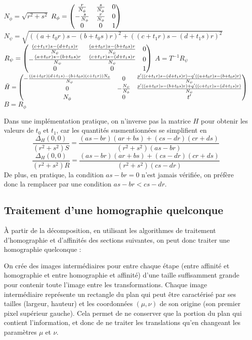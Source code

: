    \begin{algorithme}
     \label{pseudoCodeDecompo}
     \caption{$decomposition(H)$}
     $N_\phi = \sqrt{r^2+s^2}$\;
     $R_\phi = \begin{pmatrix} 
      \frac{r}{N_\phi} & \frac{s}{N_\phi} & 0\\
      -\frac{s}{N_\phi} & \frac{r}{N_\phi} & 0\\
      0 & 0 & 1 \end{pmatrix}$\;
     $N_\psi = \sqrt{((a+t_0r)s-(b+t_0s)r)^2+((c+t_1r)s-(d+t_1s)r)^2}$\;
     $R_\psi = \begin{pmatrix} 
      \frac{(c+t_1r)s-(d+t_1s)r}{N_\psi} & \frac{(a+t_0r)s-(b+t_0s)r}{N_\psi} & 0\\
      -\frac{(a+t_0r)s-(b+t_0s)r}{N_\psi} & \frac{(c+t_1r)s-(d+t_1s)r}{N_\psi} & 0\\
      0 & 0 & 1 \end{pmatrix}$\;
     $A = T^{-1}R_\psi$\;
     $\tilde H = \begin{pmatrix} 
      -\frac{((a+t_0r)(d+t_1s)-(b+t_0s)(c+t_1r))N_\phi}{N_\psi} & 0 & \frac{p'((c+t_1r)s-(d+t_1s)r)-q'((a+t_0r)s-(b+t_0s)r)}{N_\psi}\\
      0 & -\frac{N_\psi}{N_\phi} & \frac{p'((a+t_0r)s-(b+t_0s)r)+q'((c+t_1r)s-(d+t_1s)r)}{N_\psi}\\
      N_\phi & 0 & t' \end{pmatrix}$\;
     $B = R_\phi$\;
   \end{algorithme}
   Dans une implémentation pratique, on n'inverse pas la matrice $H$ pour obtenir les valeurs de $t_0$ et $t_1$, car les quantités susmentionnées se simplifient en
 \[\frac{\Delta_H(0,0)}{(r^2+s^2)S} = \frac{(as-br)(ar+bs)+(cs-dr)(cr+ds)}{(r^2+s^2)(as-br)}\]
 \[\frac{\Delta_H(0,0)}{(r^2+s^2)R} = \frac{(as-br)(ar+bs)+(cs-dr)(cr+ds)}{(r^2+s^2)(cs-dr)}\]
 De plus, en pratique, la condition $as-br=0$ n'est jamais vérifiée, on préfère donc la remplacer par une condition $as-br<cs-dr$.

\subsection{Traitement d'une homographie quelconque}
 
 À partir de la décomposition, en utilisant les algorithmes de traitement d'homographie et d'affinités des sections suivantes, on peut donc traiter une homographie quelconque :
 
 On crée des images intermédiaires pour entre chaque étape (entre affinité et homographie et entre homographie et affinité) d'une taille suffisamment grande pour contenir toute l'image entre les transformations. Chaque image intermédiaire représente un rectangle du plan qui peut être caractérisé par ses tailles (largeur, hauteur) et les coordonnées $(\mu,\nu)$ de son origine (son premier pixel supérieur gauche). Cela permet de ne conserver que la portion du plan qui contient l'information, et donc de ne traiter les translations qu'en changeant les paramètres $\mu$ et $\nu$.
 
